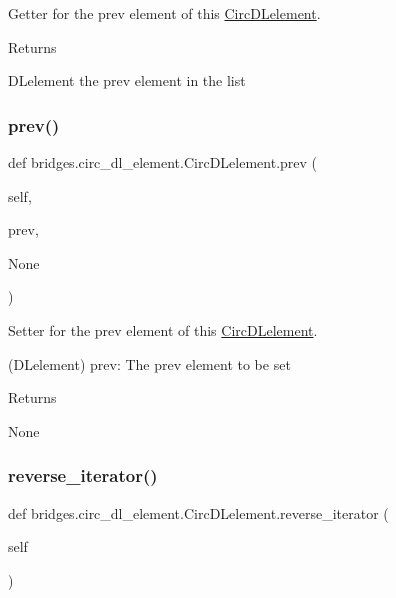Getter for the prev element of this \hyperlink{classbridges_1_1circ__dl__element_1_1_circ_d_lelement}{Circ\+D\+Lelement}. 

\begin{DoxyReturn}{Returns}


D\+Lelement the prev element in the list 
\end{DoxyReturn}
\mbox{\label{classbridges_1_1circ__dl__element_1_1_circ_d_lelement_a5b62548af44a610a2230258fe641d8a2}} 
\subsubsection{\texorpdfstring{prev()}{prev()}\hspace{0.1cm}{\footnotesize\ttfamily [2/2]}}
{\footnotesize\ttfamily def bridges.\+circ\+\_\+dl\+\_\+element.\+Circ\+D\+Lelement.\+prev (\begin{DoxyParamCaption}\item[{}]{self,  }\item[{}]{prev,  }\item[{}]{None }\end{DoxyParamCaption})}



Setter for the prev element of this \hyperlink{classbridges_1_1circ__dl__element_1_1_circ_d_lelement}{Circ\+D\+Lelement}. 

(D\+Lelement) prev\+: The prev element to be set \begin{DoxyReturn}{Returns}


None 
\end{DoxyReturn}
\mbox{\label{classbridges_1_1circ__dl__element_1_1_circ_d_lelement_ae92b2635ac5d448f4ad90d058fb5e4ab}} 
\subsubsection{\texorpdfstring{reverse\+\_\+iterator()}{reverse\_iterator()}}
{\footnotesize\ttfamily def bridges.\+circ\+\_\+dl\+\_\+element.\+Circ\+D\+Lelement.\+reverse\+\_\+iterator (\begin{DoxyParamCaption}\item[{}]{self }\end{DoxyParamCaption})}



